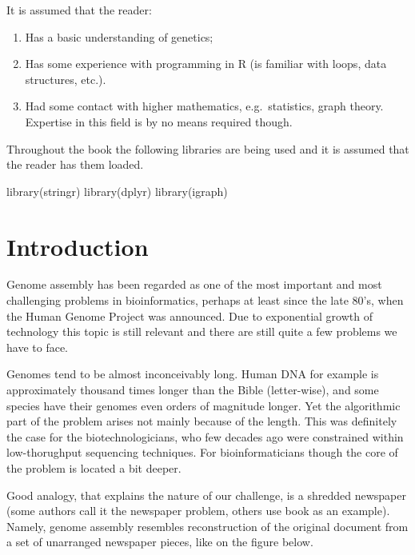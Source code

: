 \documentclass[
]{book}
\newenvironment{Shaded}{\begin{snugshade}}{\end{snugshade}}
\newcommand{\FunctionTok}[1]{\textcolor[rgb]{0.00,0.00,0.00}{#1}}
\newcommand{\NormalTok}[1]{#1}
\begin{document}
It is assumed that the reader:

\begin{enumerate}
\def\labelenumi{\arabic{enumi}.}
\item
  Has a basic understanding of genetics;
\item
  Has some experience with programming in R (is familiar with loops, data structures, etc.).
\item
  Had some contact with higher mathematics, e.g.~statistics, graph theory. Expertise in this field is by no means required though.
\end{enumerate}

Throughout the book the following libraries are being used and it is assumed that the reader has them loaded.

\begin{Shaded}
\begin{Highlighting}[]
\FunctionTok{library}\NormalTok{(stringr)}
\FunctionTok{library}\NormalTok{(dplyr)}
\FunctionTok{library}\NormalTok{(igraph)}
\end{Highlighting}
\end{Shaded}

\hypertarget{introduction}{%
\chapter{Introduction}\label{introduction}}

Genome assembly has been regarded as one of the most important and most challenging problems in bioinformatics, perhaps at least since the late 80's, when the Human Genome Project was announced. Due to exponential growth of technology this topic is still relevant and there are still quite a few problems we have to face.

Genomes tend to be almost inconceivably long. Human DNA for example is approximately thousand times longer than the Bible (letter-wise), and some species have their genomes even orders of magnitude longer. Yet the algorithmic part of the problem arises not mainly because of the length. This was definitely the case for the biotechnologicians, who few decades ago were constrained within low-thorughput sequencing techniques. For bioinformaticians though the core of the problem is located a bit deeper.

Good analogy, that explains the nature of our challenge, is a shredded newspaper (some authors call it the newspaper problem, others use book as an example). Namely, genome assembly resembles reconstruction of the original document from a set of unarranged newspaper pieces, like on the figure below.
\end{document}
